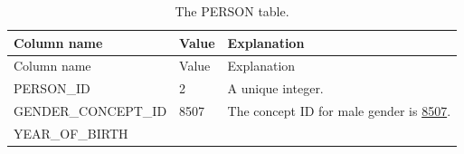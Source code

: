 \documentclass[10.5pt]{book}
\theoremstyle{definition}
\theoremstyle{definition}
\theoremstyle{definition}
\theoremstyle{remark}
\begin{document}
\begin{longtable}[]{@{}lll@{}}
\caption{\label{tab:johnPerson} The PERSON table.}\tabularnewline
\toprule
\begin{minipage}[b]{0.28\columnwidth}\raggedright\strut
Column name\strut
\end{minipage} & \begin{minipage}[b]{0.16\columnwidth}\raggedright\strut
Value\strut
\end{minipage} & \begin{minipage}[b]{0.48\columnwidth}\raggedright\strut
Explanation\strut
\end{minipage}\tabularnewline
\midrule
\endfirsthead
\toprule
\begin{minipage}[b]{0.28\columnwidth}\raggedright\strut
Column name\strut
\end{minipage} & \begin{minipage}[b]{0.16\columnwidth}\raggedright\strut
Value\strut
\end{minipage} & \begin{minipage}[b]{0.48\columnwidth}\raggedright\strut
Explanation\strut
\end{minipage}\tabularnewline
\midrule
\endhead
\begin{minipage}[t]{0.28\columnwidth}\raggedright\strut
PERSON\_ID\strut
\end{minipage} & \begin{minipage}[t]{0.16\columnwidth}\raggedright\strut
2\strut
\end{minipage} & \begin{minipage}[t]{0.48\columnwidth}\raggedright\strut
A unique integer.\strut
\end{minipage}\tabularnewline
\begin{minipage}[t]{0.28\columnwidth}\raggedright\strut
GENDER\_CONCEPT\_ID\strut
\end{minipage} & \begin{minipage}[t]{0.16\columnwidth}\raggedright\strut
8507\strut
\end{minipage} & \begin{minipage}[t]{0.48\columnwidth}\raggedright\strut
The concept ID for male gender is
\href{http://athena.ohdsi.org/search-terms/terms/8507}{8507}.\strut
\end{minipage}\tabularnewline
\begin{minipage}[t]{0.28\columnwidth}\raggedright\strut
YEAR\_OF\_BIRTH\strut
\end{minipage} & \begin{minipage}[t]{0.16\columnwidth}\raggedright\strut

\end{minipage}
\end{longtable}
\end{document}
